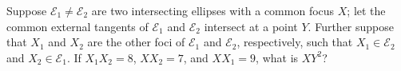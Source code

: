 Suppose $\mathcal{E}_1\neq\mathcal{E}_2$ are two intersecting ellipses with a common focus $X$; let the common external tangents of $\mathcal{E}_1$ and $\mathcal{E}_2$ intersect at a point $Y$. Further suppose that $X_1$ and $X_2$ are the other foci of $\mathcal{E}_1$ and $\mathcal{E}_2$, respectively, such that $X_1\in\mathcal{E}_2$ and $X_2\in\mathcal{E}_1$. If $X_1X_2=8$, $XX_2=7$, and $XX_1=9$, what is $XY^2$?